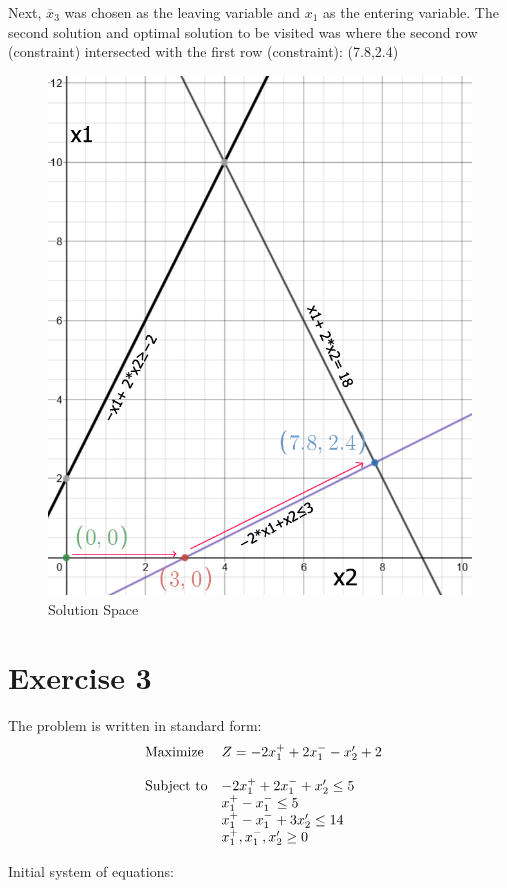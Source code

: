\documentclass{article}
\begin{document}
Next, $\overline{x}_3$ was chosen as the leaving variable and $x_1$ as the entering variable.
The second solution and optimal solution to be visited was where the second row (constraint) intersected with the first row (constraint): (7.8,2.4)

\begin{figure}[H]
  \centering
  \includegraphics[width=0.6\linewidth]{lpc.PNG}
  \caption{Solution Space}
\end{figure}






\section{Exercise 3} %

The problem is written in standard form:
\\
\begin{equation*}
    \begin{array}{ll@{}ll}
    \text{Maximize}  & Z=-2x_1^++2x_1^- -x_2'+2 \\
                     & \\
    \text{Subject to}& -2x_1^++2x_1^- +x_2' \leq 5 \\
                     & x_1^+-x_1^- \leq 5\\
                     & x_1^+-x_1^- +3x_2' \leq 14\\
                     & x^+_1, x^-_1, x_2' \geq 0
\end{array}
\end{equation*}

Initial system of equations:
\end{document}
